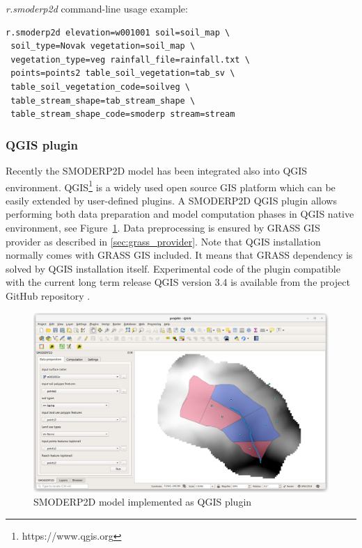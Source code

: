 {\em r.smoderp2d} command-line usage example:
\begin{verbatim}
r.smoderp2d elevation=w001001 soil=soil_map \
 soil_type=Novak vegetation=soil_map \
 vegetation_type=veg rainfall_file=rainfall.txt \
 points=points2 table_soil_vegetation=tab_sv \
 table_soil_vegetation_code=soilveg \
 table_stream_shape=tab_stream_shape \
 table_stream_shape_code=smoderp stream=stream 
\end{verbatim}

\subsubsection{QGIS plugin}
Recently the SMODERP2D model has been integrated also into QGIS
environment. QGIS\footnote{https://www.qgis.org} is a widely used open
source GIS platform which can be easily extended by user-defined
plugins. A SMODERP2D QGIS plugin allows performing both data
preparation and model computation phases in QGIS native environment,
see Figure~\ref{fig:smoderp2_qgis}. Data preprocessing is ensured by
GRASS GIS provider as described in \ref{sec:grass_provider}. Note that
QGIS installation normally comes with GRASS GIS included. It means
that GRASS dependency is solved by QGIS installation
itself. Experimental code of the plugin compatible with the current
long term release QGIS version 3.4 is available from the project GitHub
repository \cite{smoderp2d-github-2019}.

\begin{figure}[ht!]
  \begin{center}
    \includegraphics[width=1.0\columnwidth]{figures/smoderp2d_qgis.png}
    \caption{SMODERP2D model implemented as QGIS plugin}
    \label{fig:smoderp2_qgis}
  \end{center}
\end{figure}

